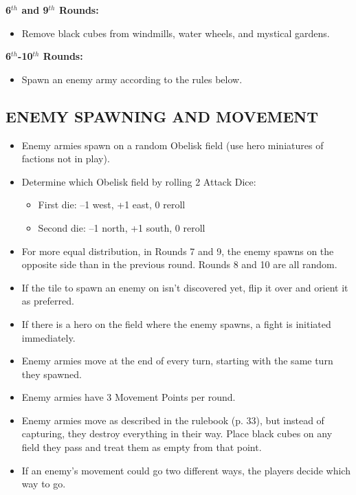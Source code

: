 \begin{multicols*}{2}
\textbf{6$^{th}$ and 9$^{th}$ Rounds:}
\begin{itemize}
  \item Remove black cubes from windmills, water wheels, and mystical gardens.
\end{itemize}

\textbf{6$^{th}$-10$^{th}$ Rounds:}
\begin{itemize}
  \item Spawn an enemy army according to the rules below.
\end{itemize}

\end{multicols*}

\newpage

\subsection*{\MakeUppercase{Enemy Spawning and Movement}}

\begin{itemize}
  \item Enemy armies spawn on a random Obelisk field (use hero miniatures of factions not in play).
  \item Determine which Obelisk field by rolling 2 Attack Dice:
  \begin{itemize}
    \item First die: --1 west, +1 east, 0 reroll
    \item Second die: --1 north, +1 south, 0 reroll
  \end{itemize}
  \item For more equal distribution, in Rounds 7 and 9, the enemy spawns on the opposite side than in the previous round.
    Rounds 8 and 10 are all random.
  \item If the tile to spawn an enemy on isn't discovered yet, flip it over and orient it as preferred.
  \item If there is a hero on the field where the enemy spawns, a fight is initiated immediately.
  \item Enemy armies move at the end of every turn, starting with the same turn they spawned.
  \item Enemy armies have 3 Movement Points per round.
  \item Enemy armies move as described in the rulebook (p. 33), but instead of capturing, they destroy everything in their way.
    Place black cubes on any field they pass and treat them as empty from that point.
  \item If an enemy's movement could go two different ways, the players decide which way to go.
\end{itemize}


